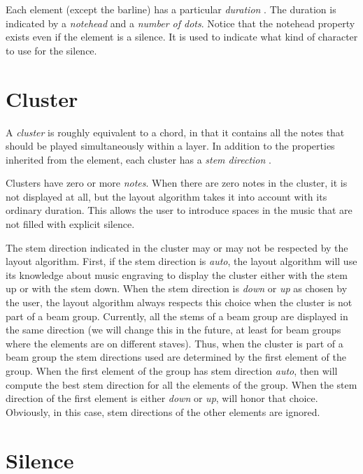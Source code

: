 Each element (except the barline) has a particular \emph{duration}
.  The duration is indicated by a \emph{notehead}
 and a \emph{number of dots}. 
 Notice that the notehead property exists even
if the element is a silence.  It is used to indicate what kind of
character to use for the silence.


\section{Cluster}

A \emph{cluster} is roughly equivalent to a chord, in
that it contains all the notes that should be played simultaneously
within a layer.  In addition to the properties inherited from the
element, each cluster has a \emph{stem direction}  .

Clusters have zero or more \emph{notes}.  When there are zero notes in
the cluster, it is not displayed at all, but the layout algorithm
takes it into account with its ordinary duration.  This allows the
user to introduce spaces in the music that are not filled with
explicit silence. 

The stem direction indicated in the cluster may or may not be
respected by the layout algorithm.  First, if the stem direction is
\emph{auto}, the layout algorithm will use its knowledge about music
engraving to display the cluster either with the stem up or with the
stem down.  When the stem direction is \emph{down} or \emph{up} as
chosen by the user, the layout algorithm always respects this choice
when the cluster is not part of a beam group.  Currently, all the
stems of a beam group are displayed in the same direction (we will
change this in the future, at least for beam groups where the elements
are on different staves).  Thus, when the cluster is part of a beam
group the stem directions used are determined by the first element of
the group.  When the first element of the group has stem direction
\emph{auto}, then {\gs} will compute the best stem direction for all
the elements of the group.  When the stem direction of the first
element is either \emph{down} or \emph{up}, {\gs} will honor that
choice.  Obviously, in this case, stem directions of the other
elements are ignored. 

\section{Silence}

